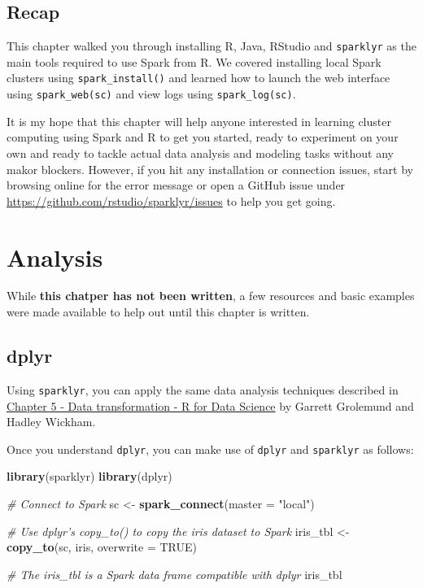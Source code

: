 \documentclass[]{book}
\newenvironment{Shaded}{\begin{snugshade}}{\end{snugshade}}
\newcommand{\CommentTok}[1]{\textcolor[rgb]{0.56,0.35,0.01}{\textit{#1}}}
\newcommand{\DataTypeTok}[1]{\textcolor[rgb]{0.13,0.29,0.53}{#1}}
\newcommand{\KeywordTok}[1]{\textcolor[rgb]{0.13,0.29,0.53}{\textbf{#1}}}
\newcommand{\NormalTok}[1]{#1}
\newcommand{\OtherTok}[1]{\textcolor[rgb]{0.56,0.35,0.01}{#1}}
\newcommand{\StringTok}[1]{\textcolor[rgb]{0.31,0.60,0.02}{#1}}
\theoremstyle{definition}
\theoremstyle{definition}
\theoremstyle{definition}
\theoremstyle{remark}
\begin{document}
\hypertarget{recap}{%
\section{Recap}\label{recap}}

This chapter walked you through installing R, Java, RStudio and
\texttt{sparklyr} as the main tools required to use Spark from R. We
covered installing local Spark clusters using \texttt{spark\_install()}
and learned how to launch the web interface using
\texttt{spark\_web(sc)} and view logs using \texttt{spark\_log(sc)}.

It is my hope that this chapter will help anyone interested in learning
cluster computing using Spark and R to get you started, ready to
experiment on your own and ready to tackle actual data analysis and
modeling tasks without any makor blockers. However, if you hit any
installation or connection issues, start by browsing online for the
error message or open a GitHub issue under
\url{https://github.com/rstudio/sparklyr/issues} to help you get going.

\hypertarget{dplyr}{%
\chapter{Analysis}\label{dplyr}}

While \textbf{this chatper has not been written}, a few resources and
basic examples were made available to help out until this chapter is
written.

\hypertarget{dplyr-1}{%
\section{dplyr}\label{dplyr-1}}

Using \texttt{sparklyr}, you can apply the same data analysis techniques
described in \href{http://r4ds.had.co.nz/transform.html}{Chapter 5 -
Data transformation - R for Data Science} by Garrett Grolemund and
Hadley Wickham.

Once you understand \texttt{dplyr}, you can make use of \texttt{dplyr}
and \texttt{sparklyr} as follows:

\begin{Shaded}
\begin{Highlighting}[]
\KeywordTok{library}\NormalTok{(sparklyr)}
\KeywordTok{library}\NormalTok{(dplyr)}

\CommentTok{# Connect to Spark}
\NormalTok{sc <-}\StringTok{ }\KeywordTok{spark_connect}\NormalTok{(}\DataTypeTok{master =} \StringTok{"local"}\NormalTok{)}

\CommentTok{# Use dplyr's copy_to() to copy the iris dataset to Spark}
\NormalTok{iris_tbl <-}\StringTok{ }\KeywordTok{copy_to}\NormalTok{(sc, iris, }\DataTypeTok{overwrite =} \OtherTok{TRUE}\NormalTok{)}

\CommentTok{# The iris_tbl is a Spark data frame compatible with dplyr}
\NormalTok{iris_tbl}
\end{Highlighting}
\end{Shaded}
\end{document}

